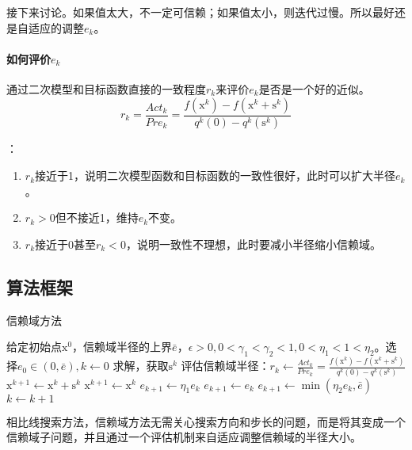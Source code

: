 \documentclass[a4paper]{D:/repositories/MyDGP/latex/PaperReadingLog}
\begin{document}
接下来讨论。如果值太大，不一定可信赖；如果值太小，则迭代过慢。所以最好还是自适应的调整$e_k$。

\paragraph{如何评价$e_k$}
通过二次模型和目标函数直接的一致程度$r_k$来评价$e_k$是否是一个好的近似。
$$
r_k=\frac{Act_k}{Pre_k}=\frac{f(\mathrm{x}^k)-f(\mathrm{x}^k+\mathrm{s}^k)}{q^k(\mathrm{0})-q^k(\mathrm{s}^k)}
$$

：
\begin{enumerate}
    \item $r_k$接近于1，说明二次模型函数和目标函数的一致性很好，此时可以扩大半径$e_k$。
    \item $r_k>0$但不接近1，维持$e_k$不变。
    \item $r_k$接近于0甚至$r_k<0$，说明一致性不理想，此时要减小半径缩小信赖域。
\end{enumerate}

\subsection{算法框架}
\begin{algorithm}
	\caption{信赖域方法} 
	\begin{algorithmic}[1]
		\STATE 给定初始点$\mathrm{x}^0$，信赖域半径的上界$\bar{e}$，$\epsilon>0,0<\gamma_1<\gamma_2<1,0<\eta_1<1<\eta_2$。选择$e_0\in(0,\bar{e}),k\leftarrow 0$
        \STATE 求解，获取$\mathrm{s}^k$
        \STATE 评估信赖域半径：$
        r_k\leftarrow\frac{Act_k}{Pre_k}=\frac{f(\mathrm{x}^k)-f(\mathrm{x}^k+\mathrm{s}^k)}{q^k(\mathrm{0})-q^k(\mathrm{s}^k)}
        $
            \STATE $\mathrm{x}^{k+1}\leftarrow \mathrm{x}^k+\mathrm{s}^k$
        \ELSE
            \STATE $\mathrm{x}^{k+1}\leftarrow \mathrm{x}^k$
        \ENDIF
            \STATE $e_{k+1}\leftarrow \eta_1e_k$
            \STATE $e_{k+1}\leftarrow e_k$
            \STATE $e_{k+1}\leftarrow\min(\eta_2e_k,\bar{e})$
        \ENDIF
        \STATE $k\leftarrow k+1$
        \ENDWHILE
	\end{algorithmic}
\end{algorithm}

相比线搜索方法，信赖域方法无需关心搜索方向和步长的问题，而是将其变成一个信赖域子问题，并且通过一个评估机制来自适应调整信赖域的半径大小。
\end{document}
